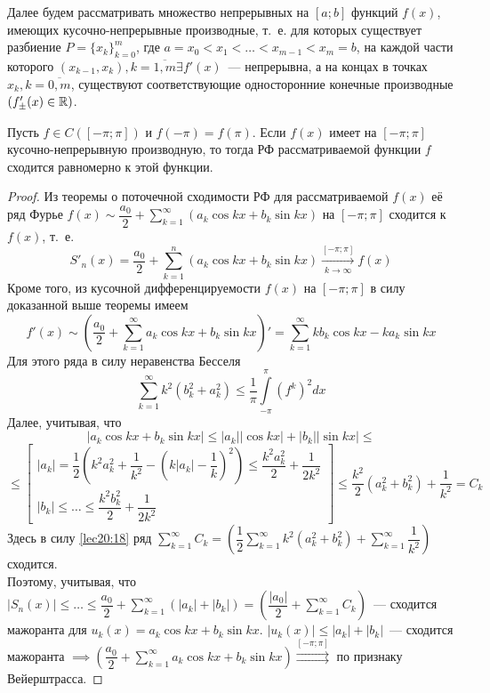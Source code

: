 \documentclass[../../main.tex]{subfiles}
\begin{document}
	Далее будем рассматривать множество непрерывных на $ [a; b] $
	функций $ f(x) $, имеющих кусочно-непрерывные производные, т.~е.
	для которых существует разбиение $ P = \{x_k\}_{k = 0}^m $, 
	где $ a = x_0 < x_1 < \dots < x_{m - 1} < x_m = b $, 
	на каждой части которого $ (x_{k - 1}, x_k), k = \overline{1, m} 
	\exists f'(x) $~--- непрерывна, а на концах в точках $ x_k,
	k = \overline{0, m} $, существуют соответствующие односторонние
	конечные производные$(f'_\pm(x) \in \mathbb{R})$.\\
	\begin{thm}
		Пусть $ f \in C([-\pi; \pi]) $ и $ f(-\pi) = f(\pi) $. 
		Если $ f(x) $ имеет на $ [-\pi; \pi] $ кусочно-непрерывную 
		производную, то тогда РФ рассматриваемой функции $f$
		сходится равномерно к этой функции.
	\end{thm}
	\begin{proof}
		Из теоремы о поточечной сходимости РФ для рассматриваемой 
		$ f(x) $ её ряд Фурье 
		$ f(x) \sim \dfrac{a_0}{2} + \sum\limits_{k = 1}^{\infty}
		(a_k\cos{kx} + b_k\sin{kx}) $ 
		на $ [-\pi; \pi] $ сходится к $ f(x) $, т.~е.
		\[
		S'_n(x) = \dfrac{a_0}{2} + \sum\limits_{k = 1}^n(
		a_k\cos{kx} + b_k\sin{kx}) 
		\stackrel{[-\pi; \pi]}{\underset{k \to \infty}{\to}} f(x)
		\]
		Кроме того, из кусочной дифференцируемости $ f(x) $ на 
		$ [-\pi; \pi] $ в силу доказанной выше теоремы имеем 
		\[
		f'(x) \sim \left(\dfrac{a_0}{2} + 
		\sum\limits_{k = 1}^\infty a_k\cos kx + b_k\sin kx
		\right)' = \sum\limits_{k = 1}^\infty kb_k\cos kx -
		ka_k\sin kx
		\]
		Для этого ряда в силу неравенства Бесселя
		\begin{equation}
		\label{lec20:18}
		\sum\limits_{k = 1}^\infty k^2(b_k^2 + a_k^2) \leq
		\dfrac{1}{\pi} \int\limits_{-\pi}^\pi (f^k)^2 dx
		\end{equation}
		Далее, учитывая, что
		\[
		|a_k\cos kx + b_k\sin kx| \leq |a_k||\cos kx| +
		|b_k||\sin kx| \leq \]\[ \leq
		\begin{bmatrix}
		|a_k| = \dfrac{1}{2}\left(
		k^2a_k^2 + \dfrac{1}{k^2} - \left(
		k|a_k| - \dfrac{1}{k}\right)^2
		\right) \leq \dfrac{k^2a_k^2}{2} + \dfrac{1}{2k^2}\\
		|b_k| \leq \dots \leq \dfrac{k^2b_k^2}{2} + \dfrac{1}{2k^2}
		\end{bmatrix} \leq \dfrac{k^2}{2}(a_k^2 + b_k^2) + \dfrac{1}{k^2} = C_k
		\]
		Здесь в силу \eqref{lec20:18} ряд 
		$
		\sum\limits_{k = 1}^\infty C_k =
		\left(
		\dfrac{1}{2} \sum\limits_{k = 1}^\infty 
		k^2(a_k^2 + b_k^2) + \sum\limits_{k = 1}^\infty
		\dfrac{1}{k^2}
		\right)
		$ сходится.\\
		Поэтому, учитывая, что $ |S_n(x)| \leq \dots \leq
		\dfrac{a_0}{2} + \sum\limits_{k = 1}^\infty(|a_k| + |b_k|)  =
		\left(\dfrac{|a_0|}{2} + \sum\limits_{k = 1}^\infty C_k\right)$~---
		сходится мажоранта для $ u_k(x) = a_k\cos kx + b_k\sin kx$.
		$ |u_k(x)| \leq |a_k| + |b_k| $~--- сходится мажоранта $ \implies
		\left(
		\dfrac{a_0}{2} + \sum\limits_{k = 1}^\infty a_k\cos kx + b_k\sin kx
		\right) 
		\stackrel{[-\pi; \pi]}{\rightrightarrows}
		$ по признаку Вейерштрасса.
	\end{proof}
\end{document}
